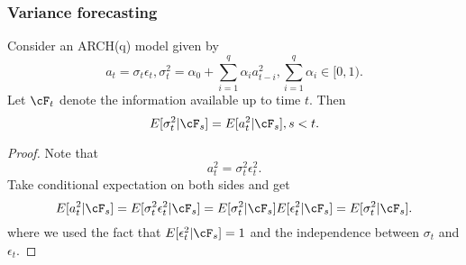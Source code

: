 \subsubsection{Variance forecasting}

\begin{lemma}\label{ch:time-series-analysis:th:ConditionalExpectationEquivalenceVarianceSquareInnovationARCH(q)}
	Consider an ARCH(q) model given by
$$a_t = \sigma_t \epsilon_t, \sigma_t^2 = \alpha_0 + \sum_{i=1}^{q} \alpha_i a_{t-i}^2, \sum_{i=1}^{q}\alpha_i \in [0,1).$$	
		Let $\cF_t$ denote the information available up to time $t$. 
	Then
		$$E[\sigma_{t}^2|\cF_s] = E[a_{t}^2|\cF_s],s < t.$$
\end{lemma}
\begin{proof}
Note that $$a_t^2 = \sigma_t^2 \epsilon_t^2.$$
Take conditional expectation on both sides and get
	$$E[a_t^2|\cF_s] = E[\sigma_t^2 \epsilon_t^2|\cF_s] = E[\sigma_t^2|\cF_s] E[\epsilon_t^2|\cF_s] = E[\sigma_t^2|\cF_s].$$
where we used the fact that $E[\epsilon_t^2|\cF_s] = 1$ and the independence between $\sigma_t$ and $\epsilon_t$.	
\end{proof}



